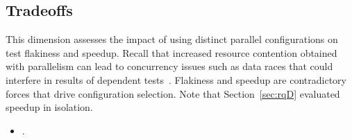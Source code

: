 \subsection{Tradeoffs}
\label{sec:rq6-tradeoffs}


This dimension assesses the impact of using distinct parallel
configurations on test flakiness and speedup.  Recall that increased
resource contention obtained with parallelism can lead to concurrency
issues such as data races that could interfere in results of dependent
tests~\cite{luo-etal-fse2014,bell-etal-esecfse2015}.  Flakiness and
speedup are contradictory forces that drive configuration selection.
Note that Section~\ref{sec:rqD} evaluated speedup in isolation.

\begin{itemize}
  \item \numRQIssuesOne{}. \textbf{\RQIssuesOne{}}
\end{itemize}





